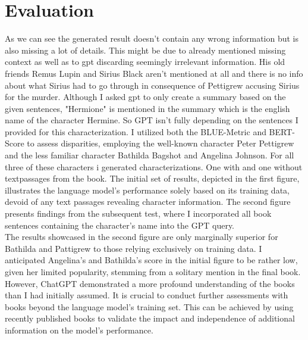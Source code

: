 \chapter{Evaluation}
As we can see the generated result doesn't contain any wrong information but is also missing a lot of details. This might be due to already mentioned missing context as well as to gpt discarding seemingly irrelevant information.
His old friends Remus Lupin and Sirius Black aren't mentioned at all and there is no info about what Sirius had to go through in consequence of Pettigrew accusing Sirius for the murder.
Although I asked gpt to only create a summary based on the given sentences, "Hermione" is mentioned in the summary which is the english name of the character Hermine. So GPT isn't fully depending on the sentences I provided for this characterization.
I utilized both the BLUE-Metric and BERT-Score to assess disparities, employing the well-known character Peter Pettigrew and the less familiar character Bathilda Bagshot and Angelina Johnson. For all three of these characters i generated characterizations. One with and one without textpassages from the book. The initial set of results, depicted in the first figure, illustrates the language model's performance solely based on its training data, devoid of any text passages revealing character information. The second figure presents findings from the subsequent test, where I incorporated all book sentences containing the character's name into the GPT query.\\
The results showcased in the second figure are only marginally superior for Bathilda and Pattigrew to those relying exclusively on training data.
I anticipated Angelina's and Bathilda's score in the initial figure to be rather low, given her limited popularity, stemming from a solitary mention in the final book. However, ChatGPT demonstrated a more profound understanding of the books than I had initially assumed.
It is crucial to conduct further assessments with books beyond the language model's training set. This can be achieved by using recently published books to validate the impact and independence of additional information on the model's performance.
\cite{post-2018-call,bert-score}
